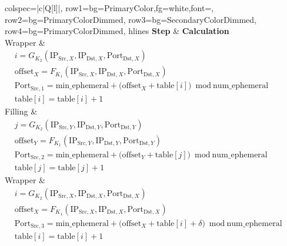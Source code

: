 \documentclass{report}
\begin{document}
\begin{center}
	\begin{tblr}{
		colspec={|c|Q[l]|},
		row{1}={bg=PrimaryColor,fg=white,font=\bfseries},
		row{2}={bg=PrimaryColorDimmed},
		row{3}={bg=SecondaryColorDimmed},
		row{4}={bg=PrimaryColorDimmed},
		hlines
		}
		\textbf{Step} & \textbf{Calculation} \\

		Wrapper       &
		\(
		\begin{aligned}
			 & i = G_{K_2}(\text{IP}_{\text{Src},X}, \text{IP}_{\text{Dst},X}, \text{Port}_{\text{Dst},X})                                   \\
			 & \text{offset}_X = F_{K_1}(\text{IP}_{\text{Src},X}, \text{IP}_{\text{Dst},X}, \text{Port}_{\text{Dst},X})                     \\
			 & \text{Port}_{\text{Src},1} = \text{min\_ephemeral} + \bigl(\text{offset}_X + \text{table}[i]\bigr)\bmod \text{num\_ephemeral} \\
			 & \text{table}[i] = \text{table}[i] + 1
		\end{aligned}
		\)                                   \\

		Filling       &
		\(
		\begin{aligned}
			 & j = G_{K_2}(\text{IP}_{\text{Src},Y}, \text{IP}_{\text{Dst},Y}, \text{Port}_{\text{Dst},Y})                                   \\
			 & \text{offset}_Y = F_{K_1}(\text{IP}_{\text{Src},Y}, \text{IP}_{\text{Dst},Y}, \text{Port}_{\text{Dst},Y})                     \\
			 & \text{Port}_{\text{Src},2} = \text{min\_ephemeral} + \bigl(\text{offset}_Y + \text{table}[j]\bigr)\bmod \text{num\_ephemeral} \\
			 & \text{table}[j] = \text{table}[j] + 1
		\end{aligned}
		\)                                   \\

		Wrapper       &
		\(
		\begin{aligned}
			 & i = G_{K_2}(\text{IP}_{\text{Src},X}, \text{IP}_{\text{Dst},X}, \text{Port}_{\text{Dst},X})                                             \\
			 & \text{offset}_X = F_{K_1}(\text{IP}_{\text{Src},X}, \text{IP}_{\text{Dst},X}, \text{Port}_{\text{Dst},X})                               \\
			 & \text{Port}_{\text{Src},3} = \text{min\_ephemeral} + \bigl(\text{offset}_X + \text{table}[i] + \delta \bigr)\bmod \text{num\_ephemeral} \\
			 & \text{table}[i] = \text{table}[i] + 1
		\end{aligned}
		\)                                   \\
	\end{tblr}
\end{center}
\end{document}

